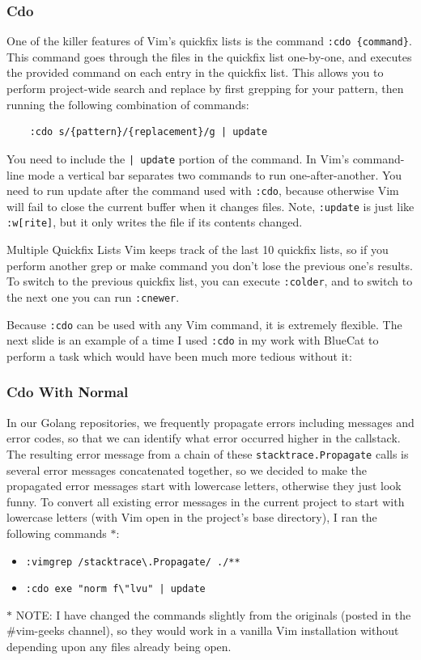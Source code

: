\documentclass{beamer}
\begin{document}
\begin{frame}[fragile]
    \frametitle{Cdo}
    \small
	One of the killer features of Vim's quickfix lists is the command \verb+:cdo {command}+. This command goes through the files in the quickfix list one-by-one, and executes the provided command on each entry in the quickfix list. This allows you to perform project-wide search and replace by first grepping for your pattern, then running the following combination of commands:
	\begin{verbatim}
	:cdo s/{pattern}/{replacement}/g | update
	\end{verbatim}
	You need to include the \verb+| update+ portion of the command. In Vim's command-line mode a vertical bar separates two commands to run one-after-another. You need to run update after the command used with \verb+:cdo+, because otherwise Vim will fail to close the current buffer when it changes files. Note, \verb+:update+ is just like \verb+:w[rite]+, but it only writes the file if its contents changed.\\
\end{frame}

\begin{frame}[fragile]
	\small
	\begin{block}{Multiple Quickfix Lists}
		Vim keeps track of the last 10 quickfix lists, so if you perform another grep or make command you don't lose the previous one's results. To switch to the previous quickfix list, you can execute \verb+:colder+, and to switch to the next one you can run \verb+:cnewer+.\\
	\end{block}
	\vspace{0.5cm}
	Because \verb+:cdo+ can be used with any Vim command, it is extremely flexible. The next slide is an example of a time I used \verb+:cdo+ in my work with BlueCat to perform a task which would have been much more tedious without it:\\
\end{frame}

\begin{frame}[fragile]
    \frametitle{Cdo With Normal}
	\small
	In our Golang repositories, we frequently propagate errors including messages and error codes, so that we can identify what error occurred higher in the callstack. The resulting error message from a chain of these \verb+stacktrace.Propagate+ calls is several error messages concatenated together, so we decided to make the propagated error messages start with lowercase letters, otherwise they just look funny. To convert all existing error messages in the current project to start with lowercase letters (with Vim open in the project's base directory), I ran the following commands $\ast$:
	\begin{itemize}
		\item \verb+:vimgrep /stacktrace\.Propagate/ ./**+
		\item \verb+:cdo exe "norm f\"lvu" | update+
	\end{itemize}
	$\ast$ NOTE: I have changed the commands slightly from the originals (posted in the \#vim-geeks channel), so they would work in a vanilla Vim installation without depending upon any files already being open.
\end{frame}
\end{document}
